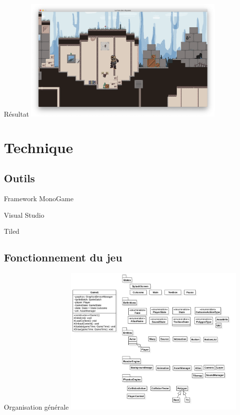 \documentclass{beamer}
\begin{document}
\begin{frame}{Résultat}
    \centering
    \includegraphics[width=10cm]{assets/ingame}
\end{frame}

\section{Technique}

\subsection{Outils}

\begin{frame}{Framework MonoGame}
  
\end{frame}

\begin{frame}{Visual Studio}
  
\end{frame}

\begin{frame}{Tiled}
  
\end{frame}

\subsection{Fonctionnement du jeu}

\begin{frame}{Organisation générale}
    \centering
    \includegraphics[width=9cm]{assets/uml}
\end{frame}
\end{document}
